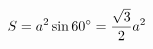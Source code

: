 \documentclass[preview]{standalone}
\begin{document}
\begin{align*}
\special{dvisvgm:raw <g id='unique000'>}S=a^2\sin 60^{\circ}=\frac{\sqrt{3}}{2}a^2\special{dvisvgm:raw </g>}
\end{align*}
\end{document}
